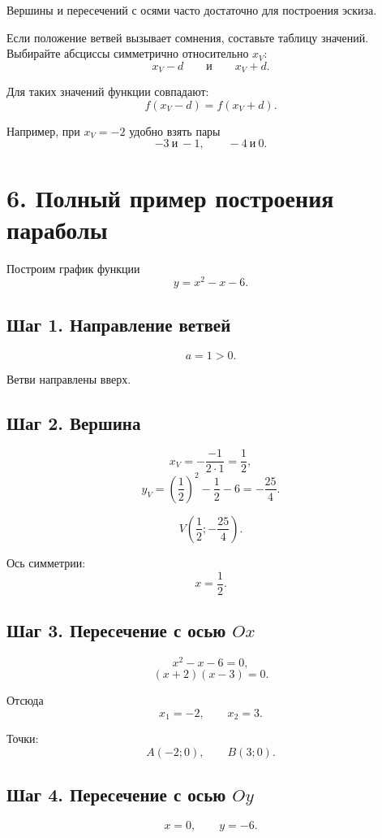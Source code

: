 \documentclass[a4paper,12pt]{article}
\begin{document}
Вершины и пересечений с осями часто достаточно для построения эскиза.

Если положение ветвей вызывает сомнения, составьте таблицу значений. Выбирайте абсциссы симметрично относительно \(x_V\):
\[
  x_V-d
  \qquad\text{и}\qquad
  x_V+d.
\]

Для таких значений функции совпадают:
\[
  f(x_V-d)=f(x_V+d).
\]

Например, при \(x_V=-2\) удобно взять пары
\[
  -3\ \text{и}\ -1,
  \qquad
  -4\ \text{и}\ 0.
\]

\section*{6. Полный пример построения параболы}

Построим график функции
\[
  y=x^2-x-6.
\]

\subsection*{Шаг 1. Направление ветвей}

\[
  a=1>0.
\]

Ветви направлены вверх.

\subsection*{Шаг 2. Вершина}

\[
  x_V=-\frac{-1}{2\cdot 1}=\frac12,
\]
\[
  y_V=
  \left(\frac12\right)^2
  -\frac12-6
  =
  -\frac{25}{4}.
\]

\[
  V\left(\frac12;-\frac{25}{4}\right).
\]

Ось симметрии:
\[
  x=\frac12.
\]

\subsection*{Шаг 3. Пересечение с осью \(Ox\)}

\[
  x^2-x-6=0,
\]
\[
  (x+2)(x-3)=0.
\]

Отсюда
\[
  x_1=-2,
  \qquad
  x_2=3.
\]

Точки:
\[
  A(-2;0),
  \qquad
  B(3;0).
\]

\subsection*{Шаг 4. Пересечение с осью \(Oy\)}

\[
  x=0,
  \qquad
  y=-6.
\]
\end{document}

